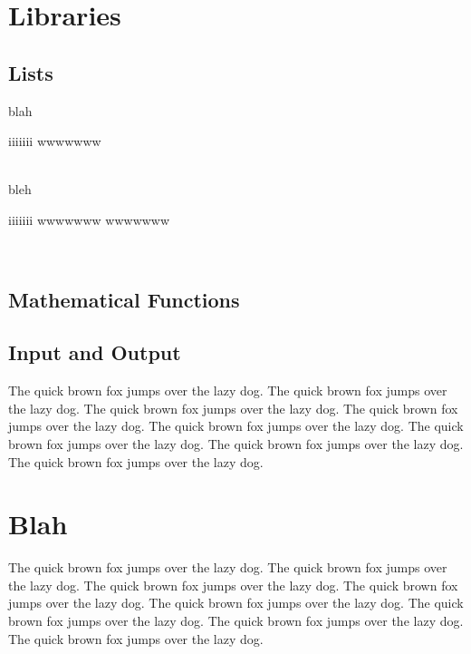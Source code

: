 \documentclass{refcard}
\begin{document}
\section{Libraries}


\subsection{Lists \hfill {}}

blah \\
\begin{ldesc}
 iiiiiii
 wwwwwww
\end{ldesc} \\
bleh

\begin{ldesc}
 iiiiiii
 wwwwwww
\li{}      wwwwwww
\end{ldesc} \\

\subsection{Mathematical Functions \hfill {}}


\subsection{Input and Output \hfill {}}


The quick brown fox jumps over the lazy dog.
The quick brown fox jumps over the lazy dog.
The quick brown fox jumps over the lazy dog.
The quick brown fox jumps over the lazy dog.
The quick brown fox jumps over the lazy dog.
The quick brown fox jumps over the lazy dog.
The quick brown fox jumps over the lazy dog.
The quick brown fox jumps over the lazy dog.

\section{Blah}

The quick brown fox jumps over the lazy dog.
The quick brown fox jumps over the lazy dog.
The quick brown fox jumps over the lazy dog.
The quick brown fox jumps over the lazy dog.
The quick brown fox jumps over the lazy dog.
The quick brown fox jumps over the lazy dog.
The quick brown fox jumps over the lazy dog.
The quick brown fox jumps over the lazy dog.
\end{document}
